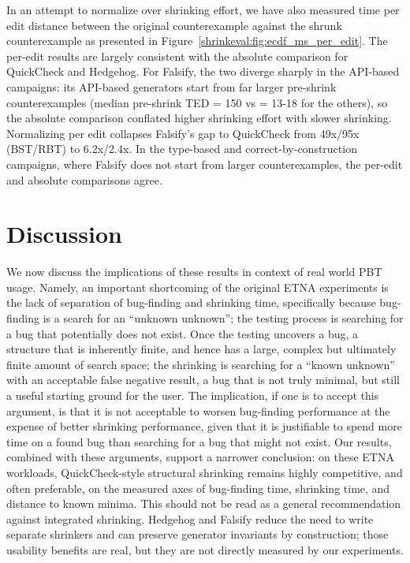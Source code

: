 In an attempt to normalize over shrinking effort, we have also measured time per edit
distance between the original counterexample against the shrunk counterexample as
presented in Figure~\ref{shrinkeval:fig:ecdf_ms_per_edit}. The per-edit results are
largely consistent with the absolute comparison for QuickCheck and Hedgehog. For
Falsify, the two diverge sharply in the API-based campaigns: its API-based generators
start from far larger pre-shrink counterexamples (median pre-shrink TED = 150 vs =
13-18 for the others), so the absolute comparison conflated higher shrinking effort
with slower shrinking. Normalizing per edit collapses Falsify's gap to QuickCheck from
49x/95x (BST/RBT) to 6.2x/2.4x. In the type-based and correct-by-construction
campaigns, where Falsify does not start from larger counterexamples, the per-edit and
absolute comparisons agree.

\section{Discussion}\label{shrinkeval:discussion}

We now discuss the implications of these results in context of real world PBT usage.
Namely, an important shortcoming of the original ETNA experiments is the lack of
separation of bug-finding and shrinking time, specifically because bug-finding is a
search for an ``unknown unknown''; the testing process is searching for a bug that
potentially does not exist. Once the testing uncovers a bug, a structure that is
inherently finite, and hence has a large, complex but ultimately finite amount of
search space; the shrinking is searching for a ``known unknown'' with an acceptable
false negative result, a bug that is not truly minimal, but still a useful starting
ground for the user.
%
The implication, if one is to accept this argument, is that it is not acceptable to
worsen bug-finding performance at the expense of better shrinking performance, given
that it is justifiable to spend more time on a found bug than searching for a bug that
might not exist.
%
Our results, combined with these arguments, support a narrower conclusion: on these
ETNA workloads, QuickCheck-style structural shrinking remains highly competitive, and
often preferable, on the measured axes of bug-finding time, shrinking time, and
distance to known minima. This should not be read as a general recommendation against
integrated shrinking. Hedgehog and Falsify reduce the need to write separate shrinkers
and can preserve generator invariants by construction; those usability benefits are
real, but they are not directly measured by our experiments.

